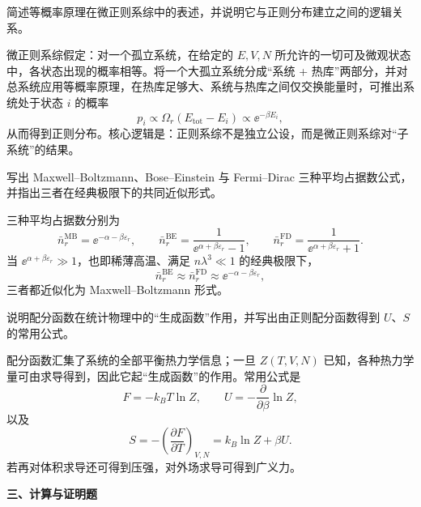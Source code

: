 \begin{question}
简述等概率原理在微正则系综中的表述，并说明它与正则分布建立之间的逻辑关系。

\begin{solution}
微正则系综假定：对一个孤立系统，在给定的 $E,V,N$ 所允许的一切可及微观状态中，各状态出现的概率相等。将一个大孤立系统分成“系统 + 热库”两部分，并对总系统应用等概率原理，在热库足够大、系统与热库之间仅交换能量时，可推出系统处于状态 $i$ 的概率
\[
p_i \propto \Omega_r(E_{\text{tot}}-E_i)\propto \ee^{-\beta E_i},
\]
从而得到正则分布。核心逻辑是：正则系综不是独立公设，而是微正则系综对“子系统”的结果。
\end{solution}
\end{question}
\begin{question}
写出 Maxwell--Boltzmann、Bose--Einstein 与 Fermi--Dirac 三种平均占据数公式，并指出三者在经典极限下的共同近似形式。

\begin{solution}
三种平均占据数分别为
\[
\bar n_r^{\mathrm{MB}} = \ee^{-\alpha-\beta\varepsilon_r},
\qquad
\bar n_r^{\mathrm{BE}} = \frac{1}{\ee^{\alpha+\beta\varepsilon_r}-1},
\qquad
\bar n_r^{\mathrm{FD}} = \frac{1}{\ee^{\alpha+\beta\varepsilon_r}+1}.
\]
当 $\ee^{\alpha+\beta\varepsilon_r}\gg 1$，也即稀薄高温、满足 $n\lambda^3\ll 1$ 的经典极限下，
\[
\bar n_r^{\mathrm{BE}}\approx \bar n_r^{\mathrm{FD}}
\approx \ee^{-\alpha-\beta\varepsilon_r},
\]
三者都近似化为 Maxwell--Boltzmann 形式。
\end{solution}
\end{question}
\begin{question}
说明配分函数在统计物理中的“生成函数”作用，并写出由正则配分函数得到 $U$、$S$ 的常用公式。

\begin{solution}
配分函数汇集了系统的全部平衡热力学信息；一旦 $Z(T,V,N)$ 已知，各种热力学量可由求导得到，因此它起“生成函数”的作用。常用公式是
\[
F=-k_B T\ln Z,
\qquad
U=-\frac{\partial}{\partial \beta}\ln Z,
\]
以及
\[
S=-\left(\frac{\partial F}{\partial T}\right)_{V,N}
= k_B\ln Z + \beta U.
\]
若再对体积求导还可得到压强，对外场求导可得到广义力。
\end{solution}
\end{question}
\textbf{三、计算与证明题}


